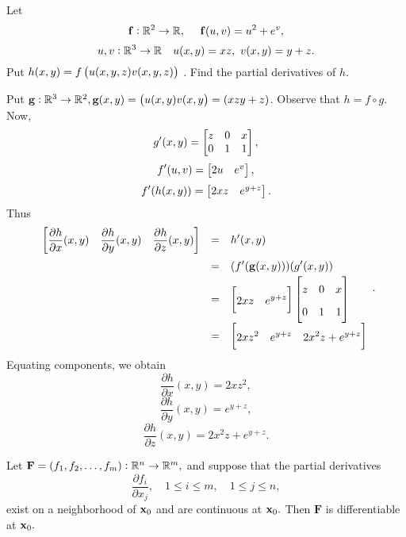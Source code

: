 \begin{exa}
Let $$\mathbf{ f}:\mathbb{R}^2 \rightarrow \mathbb{R}, \  \ \ \ \mathbf{ f}(u,v) = u^2 + e^v,$$
$$u, v:\mathbb{R}^3 \rightarrow \mathbb{R} \ \ \  u(x,y) = xz, \ v(x,y) = y + z.$$
Put $h(x,y) = f\left( u(x, y, z) \\ v(x, y, z) \right)$ . Find the partial
derivatives of $h$.\end{exa} \begin{solu} Put $\mathbf{ g}:\mathbb{R}^3
\rightarrow \mathbb{R}^2,
\mathbf{ g}(x,y) = \left( u(x,y) \\ v(x,y \right) = \left( xz \\
y + z \right)$. Observe that $h = f\circ g.$ Now,
$$ g'(x,y) = \begin{bmatrix} z & 0 & x \cr 0 & 1 & 1 \cr   \end{bmatrix},$$
$$f'(u,v) = \begin{bmatrix} 2u & e^v \cr \end{bmatrix},$$
$$f'(h(x,y)) = \begin{bmatrix} 2xz  & e^{y + z} \cr \end{bmatrix}.$$
Thus
$$\renewcommand{\arraystretch}{1.7}{\everymath{\displaystyle}
\begin{array}{lll}
\begin{bmatrix} \dfrac{\partial h}{\partial
x}(x,y)& \dfrac{\partial h}{\partial y}(x,y)& \dfrac{\partial
h}{\partial z}(x,y)\cr
\end{bmatrix} & = &
h'(x,y) \\
 &  = & (f'(\funvect{g}(x,y)))(g'(x,y)) \\
 & = &  \begin{bmatrix} 2xz  & e^{y + z} \cr
 \end{bmatrix}\begin{bmatrix} z & 0 & x \cr 0 & 1 & 1 \cr   \end{bmatrix}\\
 & = & \begin{bmatrix}  2xz^2 & e^{y + z} & 2x^2z + e^{y + z}      \end{bmatrix}
\end{array}}.$$
\renewcommand{\arraystretch}{1}
Equating components, we obtain
$$\dfrac{\partial h}{\partial
x}(x,y)= 2xz^2,$$
$$\dfrac{\partial h}{\partial
y}(x,y)=  e^{y + z},$$
$$\dfrac{\partial h}{\partial
z}(x,y)= 2x^2z + e^{y + z}.$$
\end{solu}

\begin{theorem}\label{thmtype:6.2.4}
Let  $\mathbf{F}=(f_1,f_2, \dots,f_m):\mathbb{R}^n\to\mathbb{R}^m,$ and
suppose that the partial derivatives
\begin{equation}\label{eq:6.2.7}
\frac{\partial f_i}{\partial x_j},\quad 1\le i\le m,\quad 1\le j\le
n,
\end{equation}
exist on a neighborhood of $\mathbf{ x}_0$ and
are continuous at $\mathbf{ x}_0.$ Then $\mathbf{F}$ is differentiable at
$\mathbf{ x}_0.$
\end{theorem}

